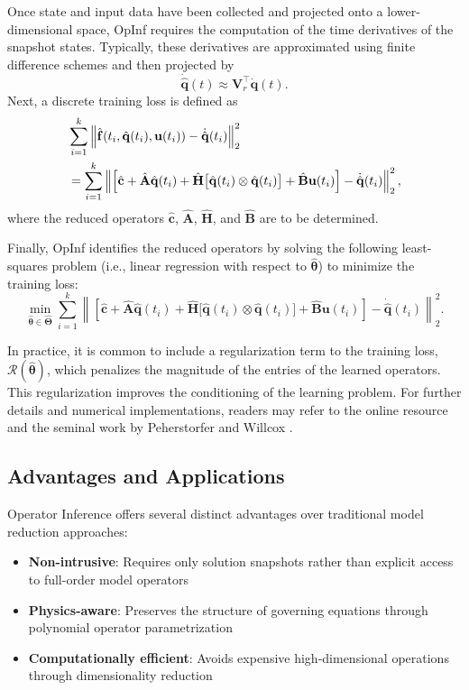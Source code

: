 Once state and input data have been collected and projected onto a lower-dimensional space, OpInf requires the computation of the time derivatives of the snapshot states. Typically, these derivatives are approximated using finite difference schemes and then projected by\\
$$\dot{\hat{\mathbf{q}}}(t) \approx \mathbf{V}_r^{\top}\dot{\mathbf{q}}(t).$$
Next, a discrete training loss is defined as\\
\begin{align}
    &\sum_{i=1}^{k} \left\| \hat{\mathbf{f}}(t_i, \hat{\mathbf{q}}(t_i), \mathbf{u}(t_i)) - \dot{\hat{\mathbf{q}}}(t_i) \right\|_2^2 \notag \\
    &= \sum_{i=1}^{k} \left\| \left[ \hat{\mathbf{c}} + \hat{\mathbf{A}}\hat{\mathbf{q}}(t_i) + \hat{\mathbf{H}}\bigl[ \hat{\mathbf{q}}(t_i) \otimes \hat{\mathbf{q}}(t_i) \bigr] + \hat{\mathbf{B}}\mathbf{u}(t_i) \right] - \dot{\hat{\mathbf{q}}}(t_i) \right\|_2^2,
    \label{loss_opinf}
\end{align}
where the reduced operators $\hat{\mathbf{c}}$, $\hat{\mathbf{A}}$, $\hat{\mathbf{H}}$, and $\hat{\mathbf{B}}$ are to be determined.

Finally, OpInf identifies the reduced operators by solving the following least-squares problem (i.e., linear regression with respect to \(\hat{\bm{\theta}}\)) to minimize the training loss:\\
\begin{equation}
    \min_{\hat{\bm{\theta}} \in \hat{\bm{\Theta}}} \sum_{i=1}^{k} \left\| \left[ \hat{\mathbf{c}} + \hat{\mathbf{A}}\hat{\mathbf{q}}(t_i) + \hat{\mathbf{H}}\bigl[ \hat{\mathbf{q}}(t_i) \otimes \hat{\mathbf{q}}(t_i) \bigr] + \hat{\mathbf{B}}\mathbf{u}(t_i) \right] - \dot{\hat{\mathbf{q}}}(t_i) \right\|_2^2.
    \label{eq:lst_opinf}
\end{equation}

In practice, it is common to include a regularization term to the training loss, $\mathcal{R}(\hat{\bm{\theta}})$, which penalizes the magnitude of the entries of the learned operators. This regularization improves the conditioning of the learning problem. For further details and numerical implementations, readers may refer to the online resource \cite{opinf2025} and the seminal work by Peherstorfer and Willcox \cite{peherstorfer2016data}.

\subsection*{Advantages and Applications}
Operator Inference offers several distinct advantages over traditional model reduction approaches:
\begin{itemize}
    \item \textbf{Non-intrusive}: Requires only solution snapshots rather than explicit access to full-order model operators
    \item \textbf{Physics-aware}: Preserves the structure of governing equations through polynomial operator parametrization
    \item \textbf{Computationally efficient}: Avoids expensive high-dimensional operations through dimensionality reduction
\end{itemize}

